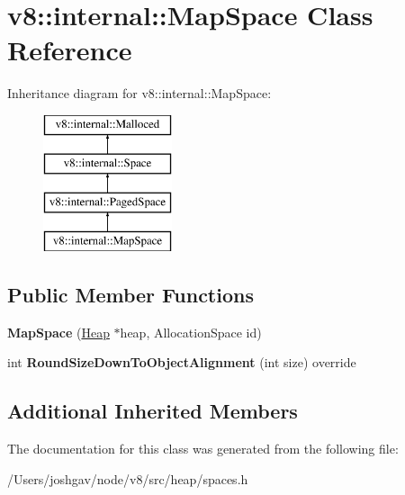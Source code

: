 \hypertarget{classv8_1_1internal_1_1_map_space}{}\section{v8\+:\+:internal\+:\+:Map\+Space Class Reference}
\label{classv8_1_1internal_1_1_map_space}
Inheritance diagram for v8\+:\+:internal\+:\+:Map\+Space\+:\begin{figure}[H]
\begin{center}
\leavevmode
\includegraphics[height=4.000000cm]{classv8_1_1internal_1_1_map_space}
\end{center}
\end{figure}
\subsection*{Public Member Functions}
\begin{DoxyCompactItemize}
\item 
{\bfseries Map\+Space} (\hyperlink{classv8_1_1internal_1_1_heap}{Heap} $\ast$heap, Allocation\+Space id)\hypertarget{classv8_1_1internal_1_1_map_space_a5dd85cc1747bf2db33f8addbffa9da17}{}\label{classv8_1_1internal_1_1_map_space_a5dd85cc1747bf2db33f8addbffa9da17}

\item 
int {\bfseries Round\+Size\+Down\+To\+Object\+Alignment} (int size) override\hypertarget{classv8_1_1internal_1_1_map_space_abc9c7d7504939f00719a37aea625e5d6}{}\label{classv8_1_1internal_1_1_map_space_abc9c7d7504939f00719a37aea625e5d6}

\end{DoxyCompactItemize}
\subsection*{Additional Inherited Members}


The documentation for this class was generated from the following file\+:\begin{DoxyCompactItemize}
\item 
/\+Users/joshgav/node/v8/src/heap/spaces.\+h\end{DoxyCompactItemize}
